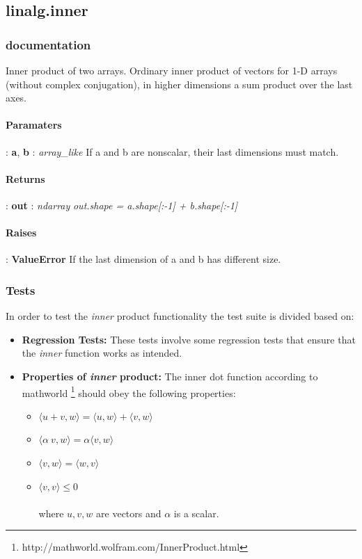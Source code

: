 \documentclass[a4paper,11pt]{article}
\begin{document}
\subsection{linalg.inner}
\subsubsection{documentation}
Inner product of two arrays. Ordinary inner product of vectors for 1-D arrays (without complex conjugation), in higher dimensions a sum product over the last axes.

\paragraph{Paramaters}:
\textbf{a}, \textbf{b} : \textit{array\_like} If a and b are nonscalar, their last dimensions must match.

\paragraph{Returns}: \textbf{out} : \textit{ndarray} \textit{out.shape = a.shape[:-1] + b.shape[:-1]}

\paragraph{Raises}:	
\textbf{ValueError} If the last dimension of a and b has different size.
\subsubsection{Tests}
In order to test the \textit{inner} product functionality the test suite is divided based on:

\begin{itemize}
	\item \textbf{Regression Tests:} These tests involve some regression tests that ensure that the \textit{inner} function works as intended.
	
	\item \textbf{Properties of \textit{inner} product:} The inner dot function according to mathworld \footnote{http://mathworld.wolfram.com/InnerProduct.html} should obey the following properties:
	
	\begin{itemize}
		\item[1.] $ \langle u + v,w \rangle = \langle u , w \rangle + \langle v , w \rangle $ 
		\item[2.] $ \langle \alpha~v,w \rangle = \alpha \langle v , w \rangle $
		\item[3.] $ \langle v,w \rangle = \langle w, v \rangle $
		\item[4.] $ \langle v,v \rangle \leq 0 $
		\\
		\\ where $ u, v, w $ are vectors and $ \alpha $ is a scalar.
	\end{itemize}
	
\end{itemize}
\end{document}
